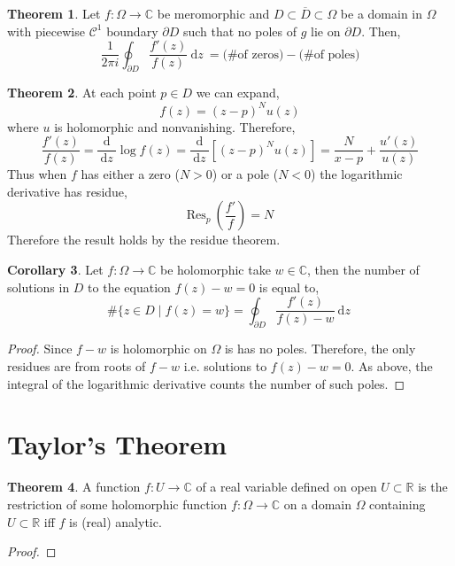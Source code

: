 \documentclass[12pt]{extarticle}
\newcommand{\R}{\mathbb{R}}
\newcommand{\C}{\mathbb{C}}
\renewcommand{\d}[1]{\: \mathrm{d}#1 \:}
\newcommand{\deriv}[2]{\frac{\d{#1}}{\d{#2}}}
\theoremstyle{definition}
\newtheorem{theorem}{Theorem}[section]
\newtheorem{corollary}[theorem]{Corollary}
\newcommand{\Res}[2]{\mathrm{Res}_{#1} \: #2}
\begin{document}
\begin{theorem}
Let $f : \Omega \to \C$ be meromorphic and $D \subset \overline{D} \subset \Omega$ be a domain in $\Omega$ with piecewise $\mathcal{C}^1$ boundary $\partial D$ such that no poles of $g$ lie on $\partial D$. Then,
\[ 
\frac{1}{2 \pi i} \oint_{\partial D} \frac{f'(z)}{f(z)} \d{z} = \text{(\# of zeros)} - \text{(\# of poles)}
\]
\end{theorem}

\begin{theorem}
At each point $p \in D$ we can expand,
\[ f(z) = (z - p)^N u(z) \]
where $u$ is holomorphic and nonvanishing. Therefore,
\[ \frac{f'(z)}{f(z)} = \deriv{}{z} \log{f(z)} = \deriv{}{z} \left[ (z - p)^N u(z) \right] = \frac{N}{x - p} + \frac{u'(z)}{u(z)} \]
Thus when $f$ has either a zero ($N > 0$) or a pole ($N < 0$) the logarithmic derivative has residue,
\[ \Res{p}{\left(\frac{f'}{f}\right)} = N \]
Therefore the result holds by the residue theorem. 
\end{theorem}

\begin{corollary}
Let $f : \Omega \to \C$ be holomorphic take $w \in \C$, then the number of solutions in $D$ to the equation $f(z) - w = 0$ is equal to,
\[ \#\{ z \in D \mid f(z) = w \} = \oint_{\partial D} \frac{f'(z)}{f(z) - w} \d{z}  \]
\end{corollary}

\begin{proof}
Since $f - w$ is holomorphic on $\Omega$ is has no poles. Therefore, the only residues are from roots of $f - w$ i.e. solutions to $f(z) - w = 0$. As above, the integral of the logarithmic derivative counts the number of such poles.  
\end{proof}


\section{Taylor's Theorem}

\begin{theorem}
A function $f : U \to \C$ of a real variable defined on open $U \subset \R$ is the restriction of some holomorphic function $f : \Omega \to \C$ on a domain $\Omega$ containing $U \subset \R$ iff $f$ is (real) analytic.
\end{theorem}

\begin{proof}

\end{proof}
\end{document}

